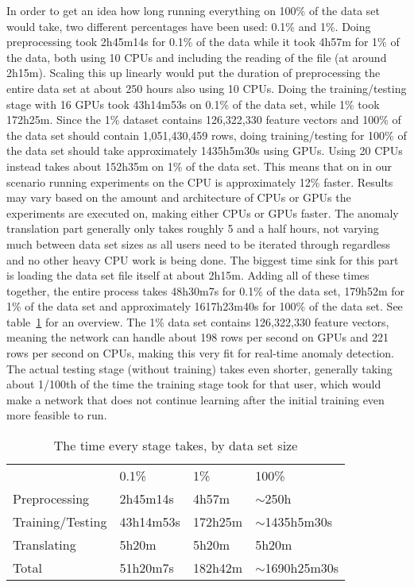 In order to get an idea how long running everything on 100\% of the data set would take, two different percentages have been used: 0.1\% and 1\%. Doing preprocessing took 2h45m14s for 0.1\% of the data while it took 4h57m for 1\% of the data, both using 10 CPUs and including the reading of the file (at around 2h15m). Scaling this up linearly would put the duration of preprocessing the entire data set at about 250 hours also using 10 CPUs. Doing the training/testing stage with 16 GPUs took 43h14m53s on 0.1\% of the data set, while 1\% took 172h25m. Since the 1\% dataset contains 126,322,330 feature vectors and 100\% of the data set should contain 1,051,430,459 rows, doing training/testing for 100\% of the data set should take approximately 1435h5m30s using GPUs. Using 20 CPUs instead takes about 152h35m on 1\% of the data set. This means that on in our scenario running experiments on the CPU is approximately 12\% faster. Results may vary based on the amount and architecture of CPUs or GPUs the experiments are executed on, making either CPUs or GPUs faster. The anomaly translation part generally only takes roughly 5 and a half hours, not varying much between data set sizes as all users need to be iterated through regardless and no other heavy CPU work is being done. The biggest time sink for this part is loading the data set file itself at about 2h15m. Adding all of these times together, the entire process takes 48h30m7s for 0.1\% of the data set, 179h52m for 1\% of the data set and approximately 1617h23m40s for 100\% of the data set. See table~\ref{tab:times_taken} for an overview. The 1\% data set contains 126,322,330 feature vectors, meaning the network can handle about 198 rows per second on GPUs and 221 rows per second on CPUs, making this very fit for real-time anomaly detection. The actual testing stage (without training) takes even shorter, generally taking about 1/100th of the time the training stage took for that user, which would make a network that does not continue learning after the initial training even more feasible to run.

\begin{table}[]
	\centering
	\caption{The time every stage takes, by data set size}
	\label{tab:times_taken}
	\begin{tabular}{llll}
										  & 0.1\%     & 1\%     & 100\%             \\ \cline{2-4} 
	\multicolumn{1}{l|}{Preprocessing}    & 2h45m14s  & 4h57m   & $\sim$250h        \\
	\multicolumn{1}{l|}{Training/Testing} & 43h14m53s & 172h25m & $\sim$1435h5m30s \\
	\multicolumn{1}{l|}{Translating}      & 5h20m     & 5h20m   & 5h20m             \\
	\multicolumn{1}{l|}{Total}            & 51h20m7s  & 182h42m & $\sim$1690h25m30s
	\end{tabular}
\end{table}